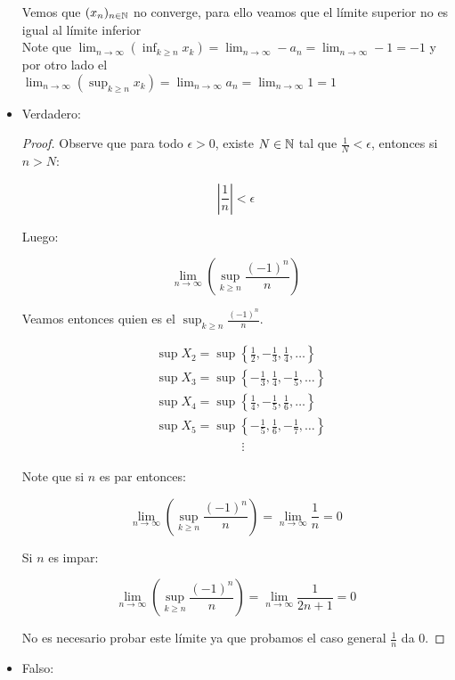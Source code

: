 \begin{itemize}[label={✎},leftmargin=*]
    Vemos que $(x_n)_{n\in\mathbb{N}}$ no converge, para ello veamos que el límite superior no es igual al límite inferior\\

    Note que $\lim_{n \to \infty} \left( \inf_{k\geq n} x_k \right)=\lim_{n \to \infty} -a_n=\lim_{n \to \infty} -1=-1$ y por otro lado el \\
    $\lim_{n \to \infty} \left( \sup_{k\geq n} x_k\right)=\lim_{n \to \infty} a_n=\lim_{n \to \infty} 1=1$

    \item Verdadero:\\ \begin{proof} 
    Observe que para todo $\epsilon>0$, existe $N\in \mathbb{N}$ tal que $\frac{1}{N}<\epsilon$, entonces si $n>N$:


    $$\left| \frac{1}{n} \right|<\epsilon$$

    Luego:

    $$\lim _{n \rightarrow \infty}\left(\sup _{k \geq n} \frac{(-1)^n}{n}\right)$$

    Veamos entonces quien es el $\sup_{k\geq n}\frac{(-1)^n}{n}$.

    \begin{align*}
        &\sup X_2=\sup \left\{\frac{1}{2},-\frac{1}{3},\frac{1}{4},\ldots\right\}\\
        &\sup X_3=\sup\left\{-\frac{1}{3},\frac{1}{4},-\frac{1}{5},\ldots\right\}\\
        &\sup X_4=\sup\left\{\frac{1}{4},-\frac{1}{5},\frac{1}{6},\ldots\right\}\\
        &\sup X_5=\sup\left\{-\frac{1}{5},\frac{1}{6},-\frac{1}{7},\ldots\right\}\\
        & \mathrel{\phantom{=askldfjaddsl}}\vdots
    \end{align*}

    Note que si $n$ es par entonces:

    $$\lim _{n \rightarrow \infty}\left(\sup_{k \geq n} \frac{(-1)^n}{n}\right)=\lim_{n \to \infty} \frac{1}{n}=0$$

    Si $n$ es impar:

    $$\lim _{n \rightarrow \infty}\left(\sup _{k \geq n} \frac{(-1)^n}{n}\right)=\lim_{n \to \infty} \frac{1}{2n+1}=0$$
    
    No es necesario probar este límite ya que probamos el caso general $\frac{1}{n}$ da 0.

    \end{proof} 


    \item Falso: 


\end{itemize}
